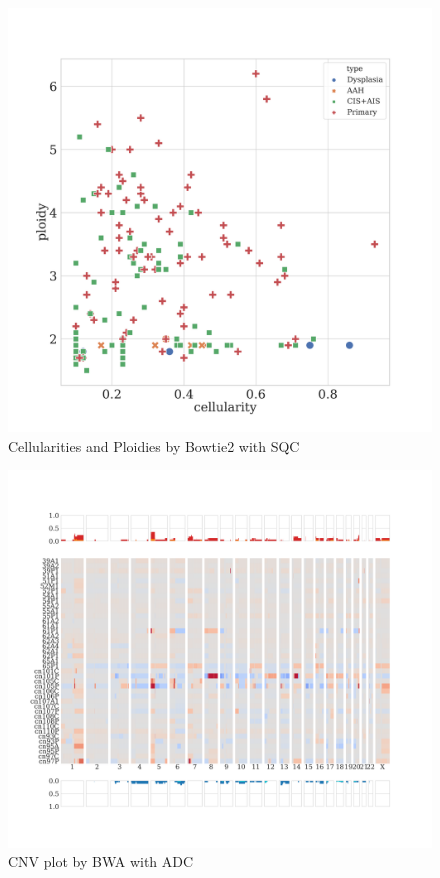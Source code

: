 \documentclass[a4paper]{article}
\begin{document}
            \begin{figure}[htbp]
                \centering
                \includegraphics[width=0.6 \linewidth]{figures/Sequenza/Bowtie2-sequenza-SQC.pdf}
                \caption{Cellularities and Ploidies by Bowtie2 with SQC}
                \label{fig:sequenza-Bowtie2-SQC}
            \end{figure}

            \begin{figure}[htbp]
                \centering
                \includegraphics[width=\linewidth]{figures/Sequenza/BWA-genome-ADC.pdf}
                \caption{CNV plot by BWA with ADC}
                \label{fig:CNV-BWA-ADC}
            \end{figure}
\end{document}
